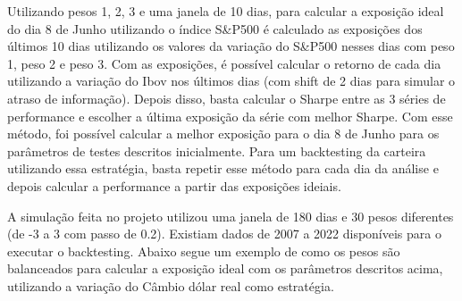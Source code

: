 Utilizando pesos 1, 2, 3 e uma janela de 10 dias, para calcular a exposição ideal do dia 8 de Junho utilizando o índice S\&P500 é calculado as exposições dos últimos 10 dias utilizando os valores da variação do S\&P500 nesses dias com peso 1, peso 2 e peso 3. Com as exposições, é possível calcular o retorno de cada dia utilizando a variação do Ibov nos últimos dias (com shift de 2 dias para simular o atraso de informação). Depois disso, basta calcular o Sharpe entre as 3 séries de performance e escolher a última exposição da série com melhor Sharpe. Com esse método, foi possível calcular a melhor exposição para o dia 8 de Junho para os parâmetros de testes descritos inicialmente. Para um backtesting da carteira utilizando essa estratégia, basta repetir esse método para cada dia da análise e depois calcular a performance a partir das exposições ideiais.

A simulação feita no projeto utilizou uma janela de 180 dias e 30 pesos diferentes (de -3 a 3 com passo de 0.2). Existiam dados de 2007 a 2022 disponíveis para o executar o backtesting. Abaixo segue um exemplo de como os pesos são balanceados para calcular a exposição ideal com os parâmetros descritos acima, utilizando a variação do Câmbio dólar real como estratégia.

